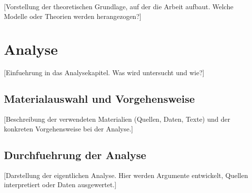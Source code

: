 [Vorstellung der theoretischen Grundlage, auf der die Arbeit aufbaut.
Welche Modelle oder Theorien werden herangezogen?]


\chapter{Analyse}
\label{chap:analyse}


[Einfuehrung in das Analysekapitel. Was wird untersucht und wie?]


\section{Materialauswahl und Vorgehensweise}
\label{sec:material}

[Beschreibung der verwendeten Materialien (Quellen, Daten, Texte)
und der konkreten Vorgehensweise bei der Analyse.]


\section{Durchfuehrung der Analyse}
\label{sec:durchfuehrung}

[Darstellung der eigentlichen Analyse. Hier werden Argumente
entwickelt, Quellen interpretiert oder Daten ausgewertet.]




